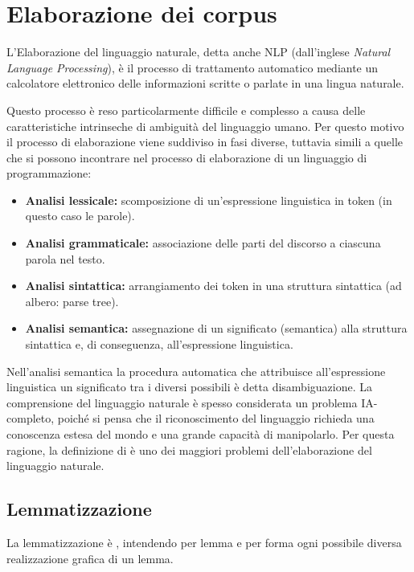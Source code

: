 \documentclass{article}
\theoremstyle{plain}
\theoremstyle{definition}
\begin{document}
\newpage
\section{Elaborazione dei corpus}
L'Elaborazione del linguaggio naturale, detta anche NLP (dall'inglese \textit{Natural Language Processing}), è il processo di trattamento automatico mediante un calcolatore elettronico delle informazioni scritte o parlate in una lingua naturale.

Questo processo è reso particolarmente difficile e complesso a causa delle caratteristiche intrinseche di ambiguità del linguaggio umano. Per questo motivo il processo di elaborazione viene suddiviso in fasi diverse, tuttavia simili a quelle che si possono incontrare nel processo di elaborazione di un linguaggio di programmazione:

\begin{itemize}
\item \textbf{Analisi lessicale:} scomposizione di un'espressione linguistica in token (in questo caso le parole).
\item \textbf{Analisi grammaticale:} associazione delle parti del discorso a ciascuna parola nel testo.
\item \textbf{Analisi sintattica:} arrangiamento dei token in una struttura sintattica (ad albero: parse tree).
\item  \textbf{Analisi semantica:} assegnazione di un significato (semantica) alla struttura sintattica e, di conseguenza, all'espressione linguistica.
\end{itemize}


Nell'analisi semantica la procedura automatica che attribuisce all'espressione linguistica un significato tra i diversi possibili è detta disambiguazione.
La comprensione del linguaggio naturale è spesso considerata un problema IA-completo, poiché si pensa che il riconoscimento del linguaggio richieda una conoscenza estesa del mondo e una grande capacità di manipolarlo. Per questa ragione, la definizione di  è uno dei maggiori problemi dell'elaborazione del linguaggio naturale.\footnotemark
{}



\subsection{Lemmatizzazione}
La lemmatizzazione è , intendendo per lemma  e per forma ogni possibile
diversa realizzazione grafica di un lemma.\footnotemark
{}
\end{document}
